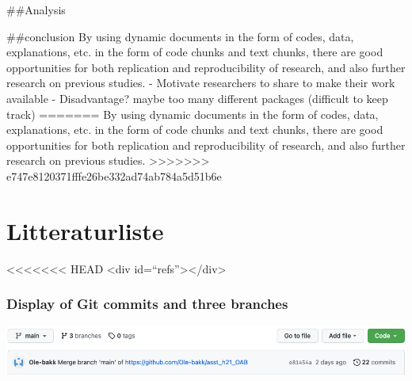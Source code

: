 \documentclass[
  12pt,
  norsk,
]{article}
\begin{document}
\#\#Analysis

\#\#conclusion By using dynamic documents in the form of codes, data,
explanations, etc. in the form of code chunks and text chunks, there are
good opportunities for both replication and reproducibility of research,
and also further research on previous studies. - Motivate researchers to
share to make their work available - Disadvantage? maybe too many
different packages (difficult to keep track)
=======
By using dynamic documents in the form of codes, data, explanations,
etc. in the form of code chunks and text chunks, there are good
opportunities for both replication and reproducibility of research, and
also further research on previous studies.
>>>>>>> e747e8120371fffe26be332ad74ab784a5d51b6e

\newpage

\hypertarget{litteraturliste}{%
\section{Litteraturliste}\label{litteraturliste}}

\textless\textless\textless\textless\textless\textless\textless{} HEAD
\textless div id=``refs''\textgreater\textless/div\textgreater{}

\hypertarget{display-of-git-commits-and-three-branches}{%
\subsubsection{Display of Git commits and three
branches}\label{display-of-git-commits-and-three-branches}}

\includegraphics{images/paste-7A7BFE4C.png}
\end{document}
